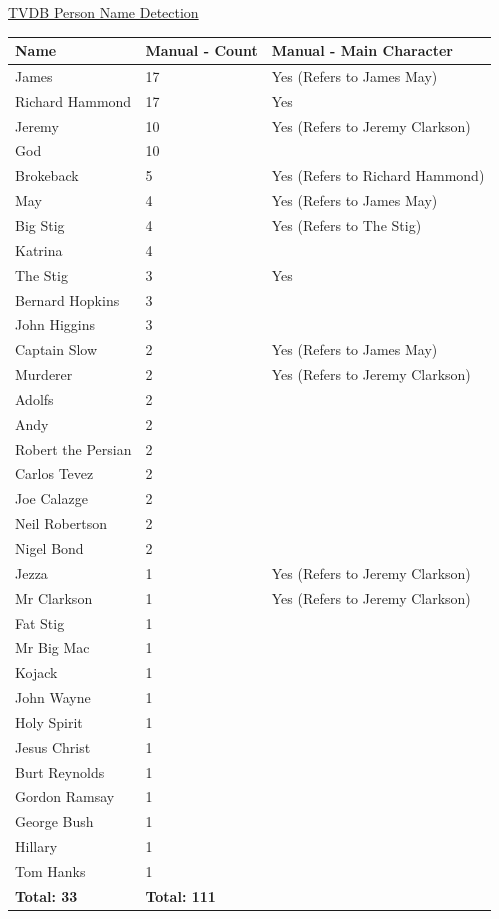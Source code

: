 \underline{TVDB Person Name Detection}
\begin{center}
\begin{tabular}{|p{120pt}|p{90pt}|p{180pt}|}
\hline
\textbf{Name}				&\textbf{Manual - Count}	&\textbf{Manual - Main Character}
\\\hline
James 				&17				&Yes (Refers to James May)
\\\hline
Richard Hammond		&17				&Yes
\\\hline
Jeremy				&10				&Yes (Refers to Jeremy Clarkson)
\\\hline
God					&10				&
\\\hline
Brokeback			&5				&Yes (Refers to Richard Hammond)
\\\hline
May					&4				&Yes (Refers to James May)
\\\hline
Big Stig				&4				&Yes (Refers to The Stig)
\\\hline
Katrina				&4				&
\\\hline
The Stig				&3				&Yes
\\\hline
Bernard Hopkins		&3				&
\\\hline
John Higgins			&3				&
\\\hline
Captain Slow			&2				&Yes (Refers to James May)
\\\hline
Murderer				&2				&Yes (Refers to Jeremy Clarkson)
\\\hline
Adolfs				&2				&
\\\hline
Andy				&2				&
\\\hline
Robert the Persian		&2				&
\\\hline
Carlos Tevez			&2				&
\\\hline
Joe Calazge			&2				&
\\\hline
Neil Robertson			&2				&
\\\hline
Nigel Bond			&2				&
\\\hline
Jezza				&1				&Yes (Refers to Jeremy Clarkson)
\\\hline
Mr Clarkson			&1				&Yes (Refers to Jeremy Clarkson)
\\\hline
Fat Stig				&1				&
\\\hline
Mr Big Mac			&1				&
\\\hline
Kojack				&1				&
\\\hline
John Wayne			&1				&
\\\hline
Holy Spirit			&1				&
\\\hline
Jesus Christ			&1				&
\\\hline
Burt Reynolds			&1				&
\\\hline
Gordon Ramsay		&1				&
\\\hline
George Bush			&1				&
\\\hline	
Hillary				&1				&	
\\\hline
Tom Hanks			&1				&	
\\\hline
\textbf{Total: 33}		&\textbf{Total: 111}	&
\\\hline
\end{tabular}
\end{center}

